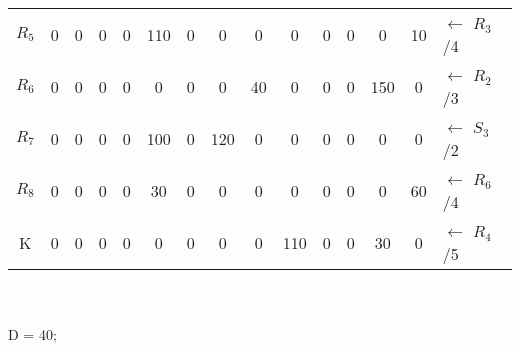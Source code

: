 \documentclass[12pt]{article}
\begin{document}
\begin{enumerate}
\begin{tabular}{|c|c|c|c|c|c|c|c|c|c|c|c|c|c|l}
$R_5$ & 0   & {\color[HTML]{000000} 0}        & {\color[HTML]{000000} 0}        & {\color[HTML]{000000} 0}        & {\color[HTML]{000000} 110} & {\color[HTML]{000000} 0}   & {\color[HTML]{000000} 0}   & {\color[HTML]{000000} 0}  & {\color[HTML]{000000} 0}   & {\color[HTML]{000000} 0}   & {\color[HTML]{000000} 0}   & {\color[HTML]{000000} 0}   & {\color[HTML]{000000} 10}  & ${\leftarrow}$ $R_3$/4 \\ \cline{1-14}
$R_6$ & 0   & {\color[HTML]{000000} 0}        & {\color[HTML]{000000} 0}        & {\color[HTML]{000000} 0}        & {\color[HTML]{000000} 0}   & {\color[HTML]{000000} 0}   & {\color[HTML]{000000} 0}   & {\color[HTML]{FE0000} 40} & {\color[HTML]{000000} 0}   & {\color[HTML]{000000} 0}   & {\color[HTML]{000000} 0}   & {\color[HTML]{000000} 150} & {\color[HTML]{000000} 0}   & ${\leftarrow}$ $R_2$/3 \\ \cline{1-14}
$R_7$ & 0   & {\color[HTML]{000000} 0}        & {\color[HTML]{000000} 0}        & {\color[HTML]{000000} 0}        & {\color[HTML]{000000} 100} & {\color[HTML]{000000} 0}   & {\color[HTML]{000000} 120} & {\color[HTML]{000000} 0}  & {\color[HTML]{000000} 0}   & {\color[HTML]{000000} 0}   & {\color[HTML]{000000} 0}   & {\color[HTML]{000000} 0}   & {\color[HTML]{000000} 0}   & ${\leftarrow}$ $S_3$/2 \\ \cline{1-14}
$R_8$ & 0   & {\color[HTML]{000000} 0}        & {\color[HTML]{000000} 0}        & {\color[HTML]{000000} 0}        & {\color[HTML]{000000} 30}  & {\color[HTML]{000000} 0}   & {\color[HTML]{000000} 0}   & {\color[HTML]{000000} 0}  & {\color[HTML]{000000} 0}   & {\color[HTML]{000000} 0}   & {\color[HTML]{000000} 0}   & {\color[HTML]{000000} 0}   & {\color[HTML]{000000} 60}  & ${\leftarrow}$ $R_6$/4 \\ \cline{1-14}
K     & 0   & {\color[HTML]{000000} 0}        & {\color[HTML]{000000} 0}        & {\color[HTML]{000000} 0}        & {\color[HTML]{000000} 0}   & {\color[HTML]{000000} 0}   & {\color[HTML]{000000} 0}   & {\color[HTML]{000000} 0}  & {\color[HTML]{000000} 110} & {\color[HTML]{000000} 0}   & {\color[HTML]{000000} 0}   & {\color[HTML]{000000} 30}  & {\color[HTML]{000000} 0}   & ${\leftarrow}$ $R_4$/5 \\ \cline{1-14}
\end{tabular}
\\
\\
D = 40;
\\
\\
\begin{tabular}{|c|c|c|c|c|c|c|c|c|c|c|c|c|c|l}
\cline{1-14}

\end{tabular}
\end{enumerate}
\end{document}
